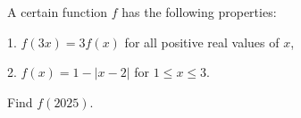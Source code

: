 A certain function $f$ has the following properties:

1. $f(3x) = 3f(x)$ for all positive real values of $x$,

2. $f(x) = 1 - |x - 2|$ for $1 \le x \le 3$.

Find $f(2025)$.
